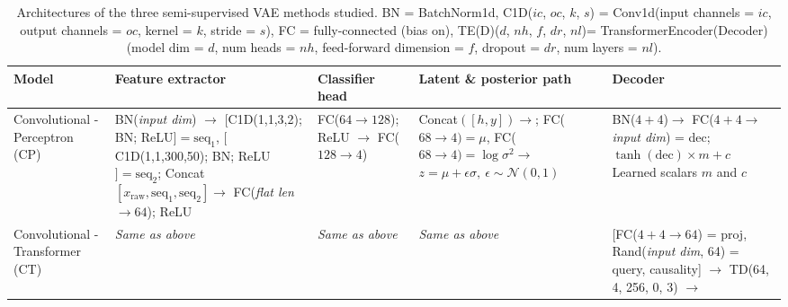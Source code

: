 \begin{table}
\centering
\caption{Architectures of the three semi-supervised VAE methods studied. BN = BatchNorm1d, C1D($ic$, $oc$, $k$, $s$) = Conv1d(input channels = $ic$, output channels = $oc$, kernel = $k$, stride = $s$),  
FC = fully-connected (bias on), TE(D)($d$, $nh$, $f$, $dr$, $nl$)= TransformerEncoder(Decoder)(model dim = $d$, num heads = $nh$, feed-forward dimension = $f$, dropout = $dr$, num layers = $nl$).}
\label{tab:ssvae_arch}
\renewcommand{\arraystretch}{1.15}
\begin{tabular}{
    >{\centering}p{3cm} %
    p{5.8cm}  p{3.0cm}  p{4.4cm} p{5.8cm}}
\toprule
\textbf{Model} & \textbf{Feature extractor} 
& \textbf{Classifier head} & \textbf{Latent \& posterior path} 
& \textbf{Decoder} \\ \midrule
%
Convolutional - Perceptron (CP) &
BN(\emph{input dim}) $\rightarrow$ \newline
$\bigl[$C1D(1,1,3,2); BN; ReLU$\bigr]={\text{seq}_1}$, \newline
$\bigl[$C1D(1,1,300,50); BN; ReLU$\bigr]={\text{seq}_2}$; \newline
Concat$[x_{\text{raw}},\text{seq}_1,\text{seq}_2]\rightarrow$ \newline
FC(\emph{flat len}$\rightarrow64$); \newline 
ReLU &
FC($64\rightarrow 128$); \newline
ReLU $\rightarrow$ \newline
FC($128\rightarrow4$) &
Concat$([h,y])\rightarrow$; \newline 
FC($68\rightarrow 4) = \mu$, \newline
FC($68\rightarrow 4) = \log\sigma^{2}\rightarrow$ \newline
$z=\mu+\epsilon\sigma,\ \epsilon\!\sim\!\mathcal N(0,1)$ &
BN($4+4$)$\rightarrow$ \newline
FC($4+4\rightarrow$ \emph{input dim}) = dec; \newline
$\tanh(\text{dec}) \times m + c$ \newline
Learned scalars $m$ and $c$ \\[4pt]
%
Convolutional - Transformer (CT) &
\emph{Same as above} &
\emph{Same as above} &
\emph{Same as above} &
[FC($4+4 \rightarrow 64$) = proj, \newline
Rand(\emph{input dim}, 64) = query, \newline
causality] $\rightarrow$ \newline
TD(64, 4, 256, 0, 3) $\rightarrow$ \newline

\end{tabular}
\end{table}
